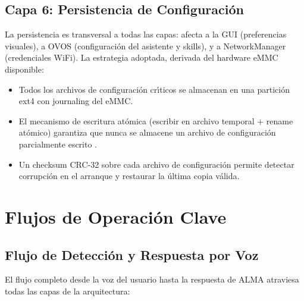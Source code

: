 \subsection{Capa 6: Persistencia de Configuraci\'{o}n}

La persistencia es transversal a todas las capas: afecta a la GUI (preferencias
visuales), a OVOS (configuraci\'{o}n del asistente y skills), y a NetworkManager
(credenciales WiFi). La estrategia adoptada, derivada del hardware eMMC disponible:

\begin{itemize}
  \item Todos los archivos de configuraci\'{o}n cr\'{\i}ticos se almacenan en
    una partici\'{o}n ext4 con journaling del eMMC.
  \item El mecanismo de escritura at\'{o}mica (escribir en archivo temporal +
    rename at\'{o}mico) garantiza que nunca se almacene un archivo de
    configuraci\'{o}n parcialmente escrito .
  \item Un checksum CRC-32 sobre cada archivo de configuraci\'{o}n permite
    detectar corrupci\'{o}n en el arranque y restaurar la \'{u}ltima copia
    v\'{a}lida.
\end{itemize}

\section{Flujos de Operaci\'{o}n Clave}
\label{sec:hwsw_flujos}

\subsection{Flujo de Detecci\'{o}n y Respuesta por Voz}

El flujo completo desde la voz del usuario hasta la respuesta de ALMA atraviesa
todas las capas de la arquitectura:

